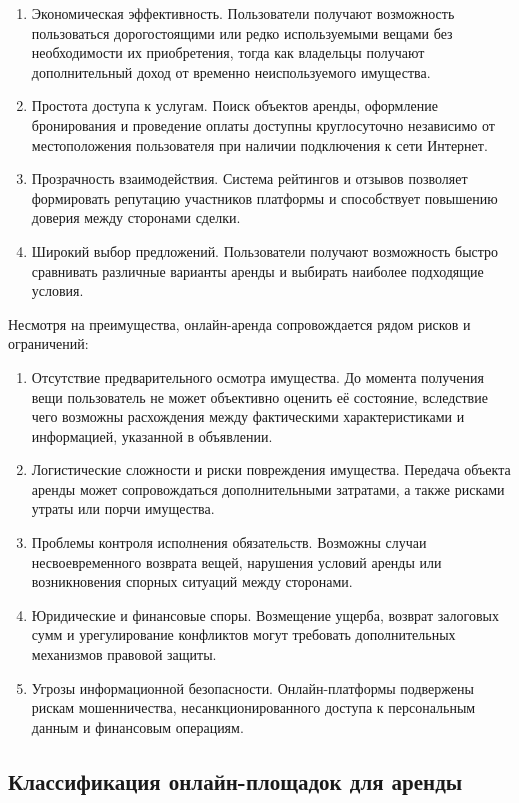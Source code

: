 \begin{enumerate}
    \item Экономическая эффективность. Пользователи получают возможность пользоваться дорогостоящими или редко используемыми вещами без необходимости их приобретения, тогда как владельцы получают дополнительный доход от временно неиспользуемого имущества.
    \item Простота доступа к услугам. Поиск объектов аренды, оформление бронирования и проведение оплаты доступны круглосуточно независимо от местоположения пользователя при наличии подключения к сети Интернет.
    \item Прозрачность взаимодействия. Система рейтингов и отзывов позволяет формировать репутацию участников платформы и способствует повышению доверия между сторонами сделки.
    \item Широкий выбор предложений. Пользователи получают возможность быстро сравнивать различные варианты аренды и выбирать наиболее подходящие условия.
\end{enumerate}

Несмотря на преимущества, онлайн-аренда сопровождается рядом рисков и ограничений:

\begin{enumerate}
    \item Отсутствие предварительного осмотра имущества. До момента получения вещи пользователь не может объективно оценить её состояние, вследствие чего возможны расхождения между фактическими характеристиками и информацией, указанной в объявлении.
    \item Логистические сложности и риски повреждения имущества. Передача объекта аренды может сопровождаться дополнительными затратами, а также рисками утраты или порчи имущества.
    \item Проблемы контроля исполнения обязательств. Возможны случаи несвоевременного возврата вещей, нарушения условий аренды или возникновения спорных ситуаций между сторонами.
    \item Юридические и финансовые споры. Возмещение ущерба, возврат залоговых сумм и урегулирование конфликтов могут требовать дополнительных механизмов правовой защиты.
    \item Угрозы информационной безопасности. Онлайн-платформы подвержены рискам мошенничества, несанкционированного доступа к персональным данным и финансовым операциям.
\end{enumerate}

\subsection{Классификация онлайн-площадок для аренды}

